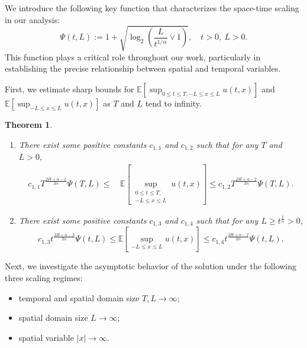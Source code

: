 \documentclass[11pt,reqno]{amsart}
\numberwithin{equation}{section}
\newtheorem{theorem}{Theorem}[section]
\def\EE{\mathbb{E}}
\newcommand{\1}{{\bf 1}}
\newcommand{\2}{{\bf 2}}
\newcommand{\lk}{\left[}
\newcommand{\rk}{\right]}
\begin{document}
We introduce the following key function that characterizes the space-time scaling in our analysis:
\begin{equation}\label{Thm3.1-2}
\Psi(t, L) := 1 + \sqrt{\log_2\left( \frac{L}{t^{1/\alpha}} \vee 1 \right)}, \quad t > 0, \ L > 0.
\end{equation}
This function plays a critical role throughout our work, particularly in establishing the precise relationship between spatial and temporal variables.

First, we estimate sharp bounds for  $\mathbb E\left[\sup_{0\leq t\leq T, -L\leq x\leq  L}u(t,x)\right]$ and $\mathbb E\left[\sup_{-L\leq x\leq L}u(t,x)\right]$  as $T$ and  $L$ tend to infinity.


\begin{theorem}\label{Thm3.1}
\begin{enumerate}
\item[(a)]
There exist some positive constants $c_{1,1}$ and $c_{1,2}$  such that  for any $T$ and $L>0$,
  \begin{align}\label{Thm3.1-1}
c_{1,1} T^{\frac{2H+\alpha-2}{2\alpha}}\Psi(T,L) \le
&\, \EE \lk\sup_{\substack{0\le t\le T, \\ -L\le x\le L}}  u(t,x) \rk\le c_{1,2} T^{\frac{2H+\alpha-2}{2\alpha}}\Psi(T,L).
  \end{align}
\item[(b)]
There exist some  positive constants $c_{1,3}$ and $c_{1,4}$  such that for any $L\geq t^{\frac{1}{\alpha}}>0$,
\begin{equation}\label{Thm3.1-5}
c_{1,3} t^{\frac{2H+\alpha-2}{2\alpha}}\Psi(t,L)\leq
\EE\left[\sup_{-L\leq x\leq L} u(t,x)\right]\leq c_{1,4} t^{\frac{2H+\alpha-2}{2\alpha}}\Psi(t, L).
\end{equation}
\end{enumerate}
\end{theorem}



Next, we investigate the asymptotic behavior of the solution  under the following three  scaling regimes:
\begin{itemize}
\item[$(1)$] temporal and spatial domain size $T, L\rightarrow\infty$;
\item[$(2)$] spatial domain size $L\rightarrow\infty$;
\item[$(3)$] spatial variable  $|x|\rightarrow\infty$.
\end{itemize} 
\end{document}
